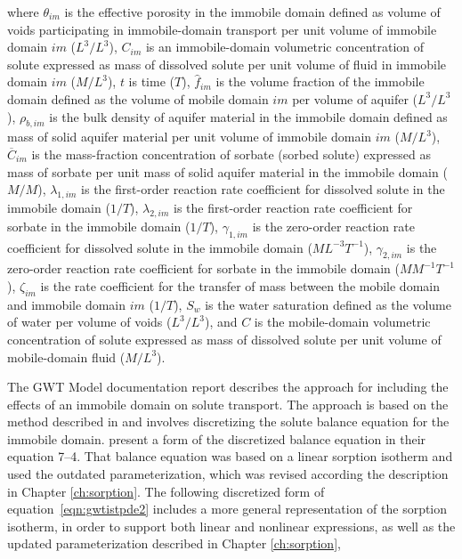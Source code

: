 \noindent where 
$\theta_{im}$ is the effective porosity in the immobile domain defined as volume of voids participating in immobile-domain transport per unit volume of immobile domain $im$ ($L^3/L^3$),
$C_{im}$ is an immobile-domain volumetric concentration of solute expressed as mass of dissolved solute per unit volume of fluid in immobile domain $im$ ($M/L^3$),
$t$ is time ($T$),
$\hat{f}_{im}$ is the volume fraction of the immobile domain defined as the volume of mobile domain $im$ per volume of aquifer ($L^3/L^3$),
$\rho_{b,im}$ is the bulk density of aquifer material in the immobile domain defined as mass of solid aquifer material per unit volume of immobile domain $im$ ($M/L^3$), 
$\overline{C}_{im}$ is the mass-fraction concentration of sorbate (sorbed solute) expressed as mass of sorbate per unit mass of solid aquifer material in the immobile domain ($M/M$), 
$\lambda_{1,im}$ is the first-order reaction rate coefficient for dissolved solute in the immobile domain ($1/T$), 
$\lambda_{2,im}$ is the first-order reaction rate coefficient for sorbate in the immobile domain ($1/T$), 
$\gamma_{1,im}$ is the zero-order reaction rate coefficient for dissolved solute in the immobile domain ($ML^{-3}T^{-1}$), 
$\gamma_{2,im}$ is the zero-order reaction rate coefficient for sorbate in the immobile domain ($M M^{-1}T^{-1}$), 
$\zeta_{im}$ is the rate coefficient for the transfer of mass between the mobile domain and immobile domain $im$ ($1/T$),
$S_w$ is the water saturation defined as the volume of water per volume of voids ($L^3/L^3$), 
and $C$ is the mobile-domain volumetric concentration of solute expressed as mass of dissolved solute per unit volume of mobile-domain fluid ($M/L^3$).

The GWT Model documentation report \citep{modflow6gwt} describes the approach for including the effects of an immobile domain on solute transport.   The approach is based on the method described in \cite{zheng2002} and involves discretizing the solute balance equation for the immobile domain.  \cite{modflow6gwt} present a form of the discretized balance equation in their equation 7--4.  That balance equation was based on a linear sorption isotherm and used the outdated parameterization, which was revised according the description in Chapter \ref{ch:sorption}.  The following discretized form of equation~\ref{eqn:gwtistpde2} includes a more general representation of the sorption isotherm, in order to support both linear and nonlinear expressions, as well as the updated parameterization described in Chapter \ref{ch:sorption},

